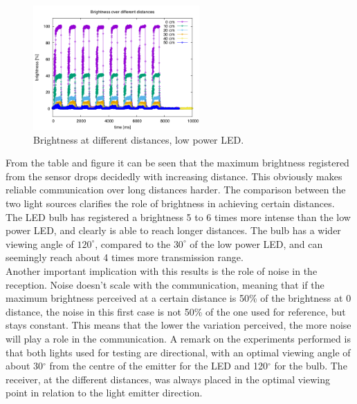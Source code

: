 \begin{figure}[hbt]
	\centering
      \includegraphics[height=180px]{img/distancephy}
  \caption{Brightness at different distances, low power LED.}
  \label{fig:distancephy}
\end{figure}

From the table and figure it can be seen that the maximum brightness registered from the sensor drops decidedly with increasing distance.
This obviously makes reliable communication over long distances harder.
The comparison between the two light sources clarifies the role of brightness in achieving certain distances.
The LED bulb has registered a brightness 5 to 6 times more intense than the low power LED, and clearly is able to reach longer distances.
The bulb has a wider viewing angle of $120^{\circ}$, compared to the $30^{\circ}$ of the low power LED, and can seemingly reach about 4 times more transmission range.\\
Another important implication with this results is the role of noise in the reception.
Noise doesn't scale with the communication, meaning that if the maximum brightness perceived at a certain distance is 50\% of the brightness at 0 distance, the noise in this first case is not 50\% of the one used for reference, but stays constant.
This means that the lower the variation perceived, the more noise will play a role in the communication.
A remark on the experiments performed is that both lights used for testing are directional, with an optimal viewing angle of about 30$^{\circ}$ from the centre of the emitter for the LED and 120$^{\circ}$ for the bulb. 
The receiver, at the different distances, was always placed in the optimal viewing point in relation to the light emitter direction.


